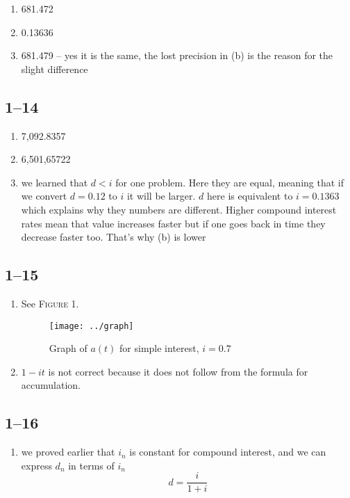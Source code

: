 \documentclass[a4paper, 12pt, reqno]{amsart}
\numberwithin{equation}{section}
\begin{document}
\begin{enumerate}[label=(\alph*)]
    \item 681.472
    \item 0.13636
    \item 681.479 -- yes it is the same, the lost precision in (b) is the
        reason for the slight difference
\end{enumerate}

\subsection*{1--14}

\begin{enumerate}[label=(\alph*)]
    \item 7,092.8357
    \item 6,501,65722
    \item we learned that $d < i$ for one problem. Here they are equal, meaning
        that if we convert $d=0.12$ to $i$ it will be larger. $d$ here is
        equivalent to $i=0.1363$ which explains why they numbers are different.
        Higher compound interest rates mean that value increases faster but if
        one goes back in time they decrease faster too. That's why (b) is
        lower
\end{enumerate}

\subsection*{1--15}

\begin{enumerate}[label=(\alph*)]
    \item See \textsc{Figure 1.}
        \begin{figure}[h]
            \texttt{[image: ../graph]}
            \caption{Graph of $a(t)$ for simple interest, $i=0.7$}
        \end{figure}
    \item $1-it$ is not correct because it does not follow from the formula for
        accumulation.
\end{enumerate}

\subsection*{1--16}

\begin{enumerate}[label=(\alph*)]
    \item we proved earlier that $i_n$ is constant for compound interest, and
        we can express $d_n$ in terms of $i_n$
        \begin{equation}\nonumber
            d = \frac{i}{1+i}
        \end{equation}
\end{enumerate}
\end{document}
